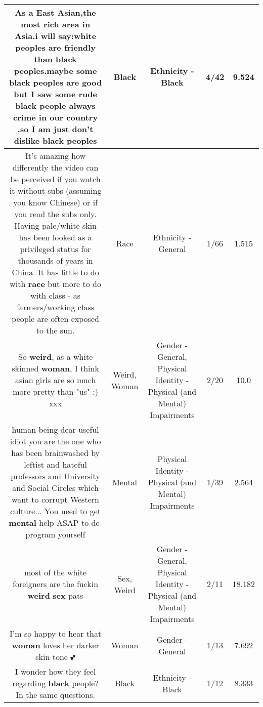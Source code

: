 \documentclass[11pt]{article}
\newlength\mylength
\begin{document}
\begin{center}
\begin{longtable}{|C{.65\mylength}|C{.30\mylength}|C{.12\mylength}|C{.12\mylength}|C{.12\mylength}|}
  \small As a East Asian,the most rich area in Asia.i will say:white peoples are friendly than \textbf{black} peoples.maybe some \textbf{black} peoples are good but I saw some rude \textbf{black} people always crime in our country .so I am just don't dislike \textbf{black} peoples\normalsize   & Black & Ethnicity - Black & 4/42 & 9.524 \\  \hline
  \small It's amazing how differently the video can be perceived if you watch it without subs (assuming you know Chinese) or if you read the subs only. Having pale/white skin has been looked as a privileged status for thousands of years in China. It has little to do with \textbf{race} but more to do with class - as farmers/working class people are often exposed to the sun.\normalsize   & Race & Ethnicity - General & 1/66 & 1.515 \\  \hline
  \small So \textbf{weird}, as a white skinned \textbf{woman}, I think asian girls are so much more pretty than "us" :) xxx\normalsize   & Weird, Woman & Gender - General, Physical Identity - Physical (and Mental) Impairments & 2/20 & 10.0 \\  \hline
  \small human being dear useful idiot you are the one who has been brainwashed by leftist and hateful professors and University and Social Circles which want to corrupt Western culture... You need to get \textbf{mental} help ASAP to de-program yourself\normalsize   & Mental & Physical Identity - Physical (and Mental) Impairments & 1/39 & 2.564 \\  \hline
  \small most of the white foreigners are the fuckin \textbf{weird} \textbf{sex} pats\normalsize   & Sex, Weird & Gender - General, Physical Identity - Physical (and Mental) Impairments & 2/11 & 18.182 \\  \hline
  \small I'm so happy to hear that \textbf{woman} loves her darker skin tone 💕\normalsize   & Woman & Gender - General & 1/13 & 7.692 \\  \hline
  \small I wonder how they feel regarding \textbf{black} people? In the same questions.\normalsize   & Black & Ethnicity - Black & 1/12 & 8.333 \\  \hline

\end{longtable}
\end{center}
\end{document}
